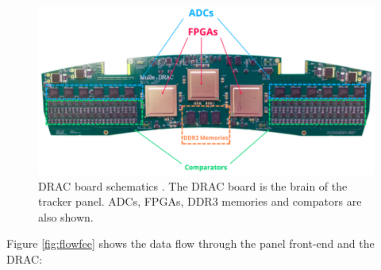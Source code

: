 \begin{figure}[!h]
\centering
\includegraphics[width =\textwidth]{figures/png/Screenshot_20240204_115052.png}
\caption[The DRAC board schematics.]{DRAC board schematics \cite{drac}. 
The DRAC board is the brain of the tracker panel. ADCs, FPGAs, DDR3 
memories and compators are also shown.}
\label{fig:drac}
\end{figure}
Figure \ref{fig:flowfee} shows the data flow through the panel front-end and the DRAC:
